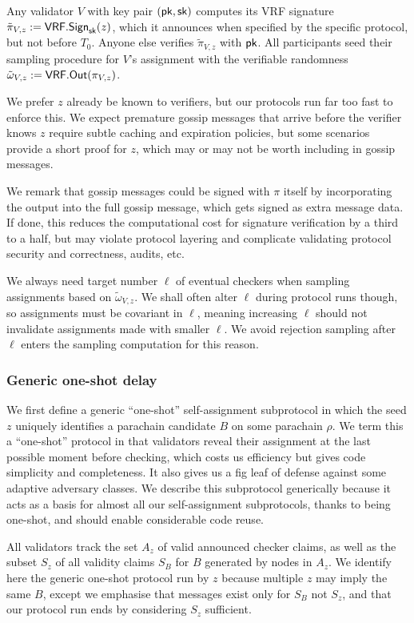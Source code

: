 Any validator $V$ with key pair $(\mathsf{pk},\mathsf{sk})$ computes its VRF signature $\tilde{\pi}_{V,z} := \mathsf{VRF}.\mathsf{Sign}_{\mathsf{sk}}(z)$, which it announces when specified by the specific protocol, but not before $T_0$.  Anyone else verifies $\tilde{\pi}_{V,z}$ with $\mathsf{pk}$.  All participants seed their sampling procedure for $V$'s assignment with the verifiable randomness $\tilde{\omega}_{V,z} := \mathsf{VRF}.\mathsf{Out}(\pi_{V,z})$.

We prefer $z$ already be known to verifiers, but our protocols run far too fast to enforce this.  We expect premature gossip messages that arrive before the verifier knows $z$ require subtle caching and expiration policies, but some scenarios provide a short proof for $z$, which may or may not be worth including in gossip messages.

We remark that gossip messages could be signed with $\pi$ itself by incorporating the output into the full gossip message, which gets signed as extra message data.  If done, this reduces the computational cost for signature verification by a third to a half, but may violate protocol layering and complicate validating protocol security and correctness, audits, etc. 

We always need target number $\ell$ of eventual checkers when sampling assignments based on $\tilde{\omega}_{V,z}$.  We shall often alter $\ell$ during protocol runs though, so assignments must be covariant in $\ell$, meaning increasing $\ell$ should not invalidate assignments made with smaller $\ell$.  We avoid rejection sampling after $\ell$ enters the sampling computation for this reason.

\subsubsection{Generic one-shot delay}

We first define a generic ``one-shot'' self-assignment subprotocol in which the seed $z$ uniquely identifies a parachain candidate $B$ on some parachain $\rho$.  We term this a ``one-shot'' protocol in that validators reveal their assignment at the last possible moment before checking, which costs us efficiency but gives code simplicity and completeness.  It also gives us a fig leaf of defense against some adaptive adversary classes.  We describe this subprotocol generically because it acts as a basis for almost all our self-assignment subprotocols, thanks to being one-shot, and should enable considerable code reuse.  

All validators track the set $A_z$ of valid announced checker claims, as well as the subset $S_z$ of all validity claims $S_B$ for $B$ generated by nodes in $A_z$.  We identify here the generic one-shot protocol run by $z$ because multiple $z$ may imply the same $B$, except we emphasise that messages exist only for $S_B$ not $S_z$, and that our protocol run ends by considering $S_z$ sufficient.  

